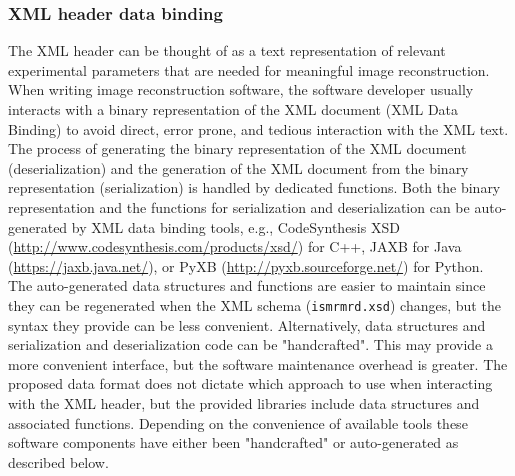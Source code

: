 \documentclass[12pt, draft]{article}
\begin{document}
\subsubsection*{XML header data binding}
The XML header can be thought of as a text representation of relevant experimental parameters that are needed for meaningful image reconstruction. When writing image reconstruction software, the software developer usually interacts with a binary representation of the XML document (XML Data Binding) to avoid direct, error prone, and tedious interaction with the XML text. The process of generating the binary representation of the XML document (deserialization) and the generation of the XML document from the binary representation (serialization) is handled by dedicated functions. Both the binary representation and the functions for serialization and deserialization can be auto-generated by XML data binding tools, e.g., CodeSynthesis XSD (\url{http://www.codesynthesis.com/products/xsd/}) for C++, JAXB for Java (\url{https://jaxb.java.net/}), or PyXB (\url{http://pyxb.sourceforge.net/}) for Python. The auto-generated data structures and functions are easier to maintain since they can be regenerated when the XML schema (\texttt{ismrmrd.xsd}) changes, but the syntax they provide can be less convenient. Alternatively, data structures and serialization and deserialization code can be "handcrafted". This may provide a more convenient interface, but the software maintenance overhead is greater. The proposed data format does not dictate which approach to use when interacting with the XML header, but the provided libraries include data structures and associated functions. Depending on the convenience of available tools these software components have either been "handcrafted" or auto-generated as described below.  
\end{document}
